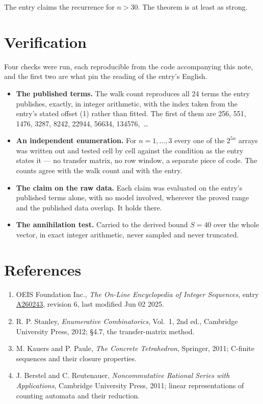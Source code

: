 \documentclass[11pt]{article}
\theoremstyle{definition}
\begin{document}
The entry claims the recurrence for $n > 30$. The theorem is at least as strong.

\section{Verification}

Four checks were run, each reproducible from the code accompanying this note, and the first two are what pin the reading of the entry's English.

\begin{itemize}

\item {\bfseries The published terms.} The walk count reproduces all 24 terms the entry publishes, exactly, in integer arithmetic, with the index taken from the entry's stated offset (1) rather than fitted. The first of them are 256, 551, 1476, 3287, 8242, 22944, 56634, 134576,~\dots

\item {\bfseries An independent enumeration.} For $n = 1,\dots,3$ every one of the $2^{5n}$ arrays was written out and tested cell by cell against the condition as the entry states it --- no transfer matrix, no row window, a separate piece of code. The counts agree with the walk count and with the entry.

\item {\bfseries The claim on the raw data.} Each claim was evaluated on the entry's published terms alone, with no model involved, wherever the proved range and the published data overlap. It holds there.

\item {\bfseries The annihilation test.} Carried to the derived bound $S = 40$ over the whole vector, in exact integer arithmetic, never sampled and never truncated.

\end{itemize}

\section{References}

\begin{enumerate}

\item OEIS Foundation Inc., \emph{The On-Line Encyclopedia of Integer Sequences}, entry \href{https://oeis.org/A260243}{A260243}, revision 6, last modified Jun 02 2025.

\item R. P. Stanley, \emph{Enumerative Combinatorics}, Vol.~1, 2nd ed., Cambridge University Press, 2012; \S4.7, the transfer-matrix method.

\item M. Kauers and P. Paule, \emph{The Concrete Tetrahedron}, Springer, 2011; C-finite sequences and their closure properties.

\item J. Berstel and C. Reutenauer, \emph{Noncommutative Rational Series with Applications}, Cambridge University Press, 2011; linear representations of counting automata and their reduction.

\end{enumerate}
\end{document}
